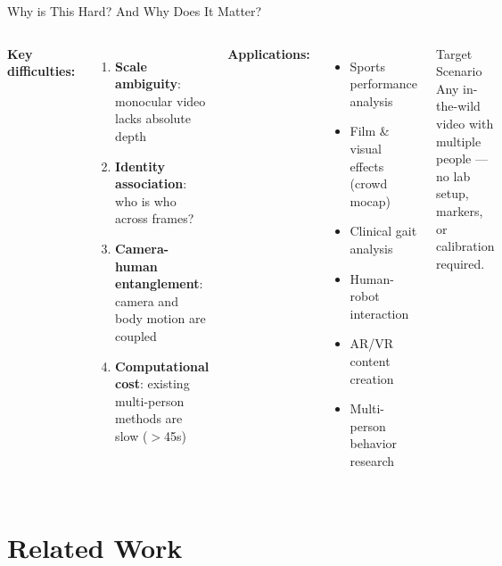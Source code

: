 \documentclass[aspectratio=169,11pt]{beamer}
\begin{document}
\begin{frame}{Why is This Hard? And Why Does It Matter?}
  \begin{columns}[T]
      \textbf{\textcolor{tamumaroon}{Key difficulties:}}
      \begin{enumerate}
        \item \textbf{Scale ambiguity}: monocular video lacks absolute depth
        \item \textbf{Identity association}: who is who across frames?
        \item \textbf{Camera-human entanglement}: camera and body motion are coupled
        \item \textbf{Computational cost}: existing multi-person methods are slow ($>$45s)
      \end{enumerate}
      \textbf{\textcolor{accentblue}{Applications:}}
      \vspace{0.3em}
      \begin{itemize}
        \item[\textbullet] Sports performance analysis
        \item[\textbullet] Film \& visual effects (crowd mocap)
        \item[\textbullet] Clinical gait analysis
        \item[\textbullet] Human-robot interaction
        \item[\textbullet] AR/VR content creation
        \item[\textbullet] Multi-person behavior research
      \end{itemize}
      \vspace{0.5em}
      \begin{block}{Target Scenario}
        \small Any in-the-wild video with multiple people —\\
        no lab setup, markers, or calibration required.
      \end{block}
  \end{columns}
\end{frame}

\section{Related Work}
\end{document}
